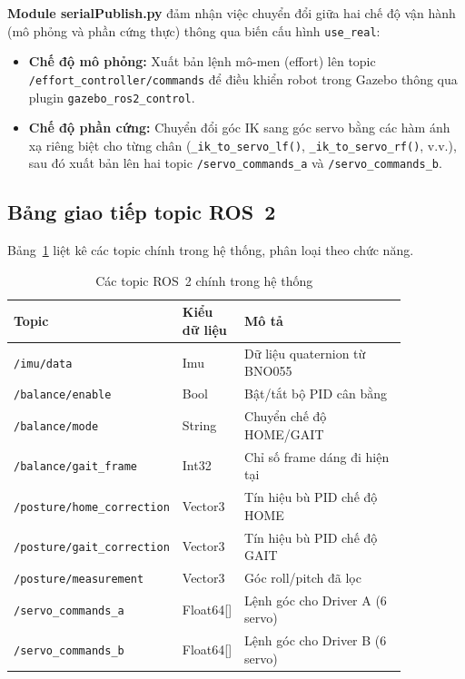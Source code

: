 \textbf{Module serialPublish.py} đảm nhận việc chuyển đổi giữa hai chế độ vận hành (mô phỏng và phần cứng thực) thông qua biến cấu hình \texttt{use\_real}:

\begin{itemize}
    \item \textbf{Chế độ mô phỏng:} Xuất bản lệnh mô-men (effort) lên topic \texttt{/effort\_controller/commands} để điều khiển robot trong Gazebo thông qua plugin \texttt{gazebo\_ros2\_control}.
    \item \textbf{Chế độ phần cứng:} Chuyển đổi góc IK sang góc servo bằng các hàm ánh xạ riêng biệt cho từng chân (\texttt{\_ik\_to\_servo\_lf()}, \texttt{\_ik\_to\_servo\_rf()}, v.v.), sau đó xuất bản lên hai topic \texttt{/servo\_commands\_a} và \texttt{/servo\_commands\_b}.
\end{itemize}

\subsection{Bảng giao tiếp topic ROS~2}

Bảng~\ref{tab:ros2_topics} liệt kê các topic chính trong hệ thống, phân loại theo chức năng.

\begin{table}[H]
\centering
\caption{Các topic ROS~2 chính trong hệ thống}
\label{tab:ros2_topics}
\renewcommand{\arraystretch}{1.3}
\begin{tabular}{|p{0.32\linewidth}|p{0.12\linewidth}|p{0.42\linewidth}|}
\hline
\textbf{Topic} & \textbf{Kiểu dữ liệu} & \textbf{Mô tả} \\ \hline
\texttt{/imu/data} & Imu & Dữ liệu quaternion từ BNO055 \\ \hline
\texttt{/balance/enable} & Bool & Bật/tắt bộ PID cân bằng \\ \hline
\texttt{/balance/mode} & String & Chuyển chế độ HOME/GAIT \\ \hline
\texttt{/balance/gait\_frame} & Int32 & Chỉ số frame dáng đi hiện tại \\ \hline
\texttt{/posture/home\_correction} & Vector3 & Tín hiệu bù PID chế độ HOME \\ \hline
\texttt{/posture/gait\_correction} & Vector3 & Tín hiệu bù PID chế độ GAIT \\ \hline
\texttt{/posture/measurement} & Vector3 & Góc roll/pitch đã lọc \\ \hline
\texttt{/servo\_commands\_a} & Float64[] & Lệnh góc cho Driver A (6 servo) \\ \hline
\texttt{/servo\_commands\_b} & Float64[] & Lệnh góc cho Driver B (6 servo) \\ \hline
\end{tabular}
\end{table}

